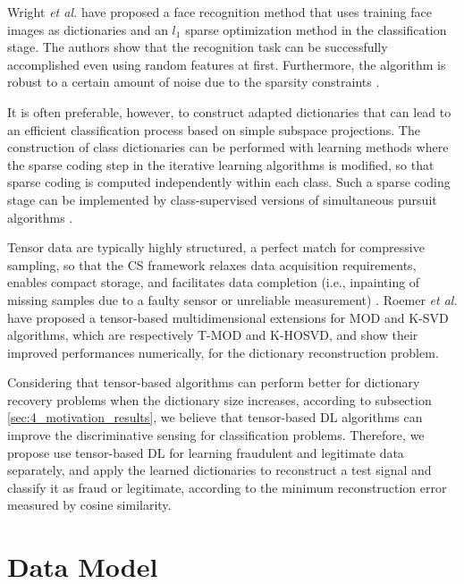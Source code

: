 Wright \emph{et al.} \cite{wright2009robust} have proposed a face recognition method that uses training face images as dictionaries and an $l_1$ sparse optimization method in the classification stage. The authors show that the recognition task can be successfully accomplished even using random features at first. Furthermore, the algorithm is robust to a certain amount of noise due to the sparsity constraints \cite{tosic2011dictionary}.

It is often preferable, however, to construct adapted dictionaries that can lead to an efficient classification process based on simple subspace projections. The construction of class dictionaries can be performed with learning methods where the sparse coding step in the iterative learning algorithms is modified, so that sparse coding is computed independently within each class. Such a sparse coding stage can be implemented by class-supervised versions of simultaneous pursuit algorithms \cite{tosic2011dictionary}.

Tensor data are typically highly structured, a perfect match for compressive sampling, so that the CS framework relaxes data acquisition requirements, enables compact storage, and facilitates data completion (i.e., inpainting of missing samples due to a faulty sensor or unreliable measurement) \cite{cichocki2015tensor}. Roemer \emph{et al.} \cite{roemer2014tensor} have proposed a tensor-based multidimensional extensions for MOD and K-SVD algorithms, which are respectively T-MOD and K-HOSVD, and show their improved performances numerically, for the dictionary reconstruction problem. 

Considering that tensor-based algorithms can perform better for dictionary recovery problems when the dictionary size increases, according to subsection \ref{sec:4_motivation_results}, we believe that tensor-based DL algorithms can improve the discriminative sensing for classification problems. Therefore, we propose use tensor-based DL for learning fraudulent and legitimate data separately, and apply the learned dictionaries to reconstruct a test signal and classify it as fraud or legitimate, according to the minimum reconstruction error measured by cosine similarity.

\section{Data Model}
\label{sec:4_datamodel}


